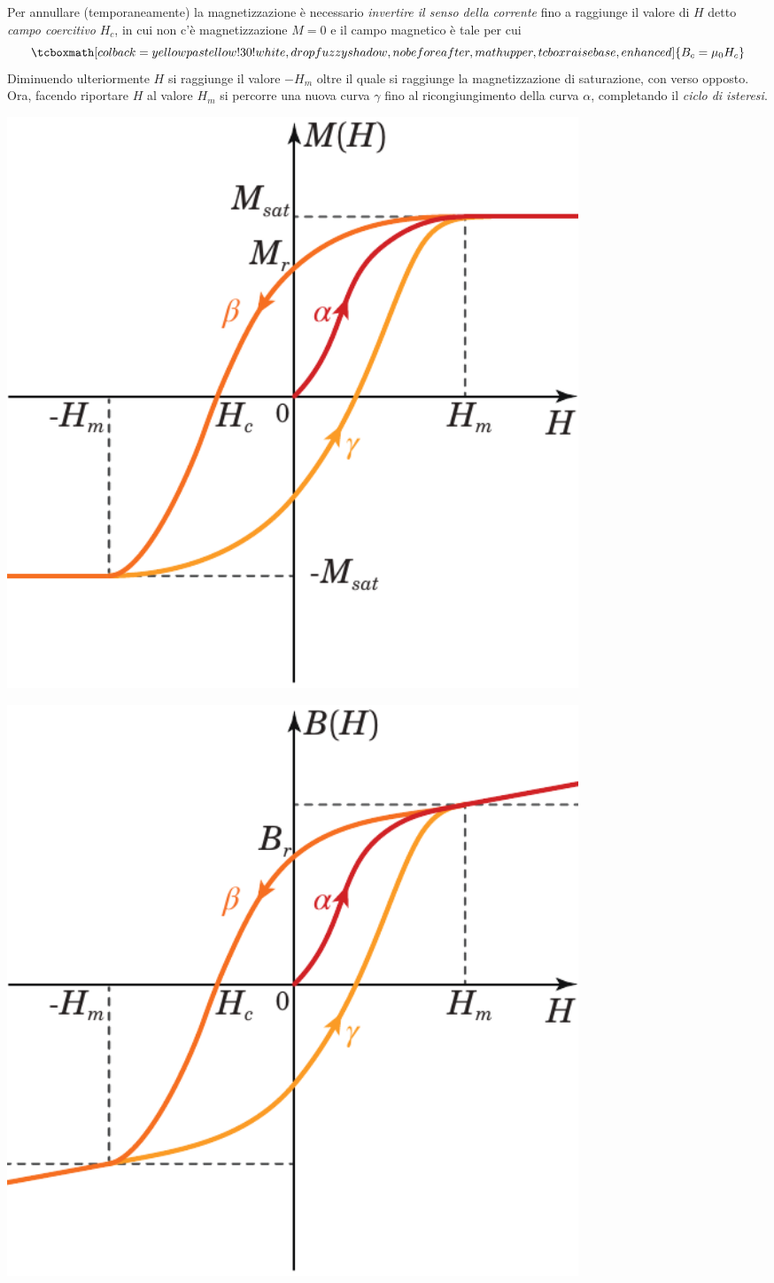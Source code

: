 Per annullare (temporaneamente) la magnetizzazione è necessario \textit{invertire il senso della corrente} fino a raggiunge il valore di $H$ detto \textit{campo coercitivo} $H_c$, in cui non c'è magnetizzazione $M=0$ e il campo magnetico è tale per cui
\begin{equation}
		\tcboxmath[colback=yellowpastellow!30!white,drop fuzzy shadow, nobeforeafter, math upper, tcbox raise base, enhanced]{B_c=\mu_0H_c}
\end{equation}
Diminuendo ulteriormente $H$ si raggiunge il valore $-H_m$ oltre il quale si raggiunge la magnetizzazione di saturazione, con verso opposto.\\
Ora, facendo riportare $H$ al valore $H_m$ si percorre una nuova curva $\gamma$ fino al ricongiungimento della curva $\alpha$, completando il \textit{ciclo di isteresi}.\\
\begin{minipage}{0.49\textwidth}
	\begin{center}
		\includegraphics[width=0.75\textwidth]{images/chp12/chp12ferromagnetigraf1.pdf}
	\end{center}
\end{minipage}
\begin{minipage}{0.49\textwidth}
	\begin{center}
		\includegraphics[width=0.75\textwidth]{images/chp12/chp12ferromagnetigraf2.pdf}
	\end{center}
\end{minipage}
